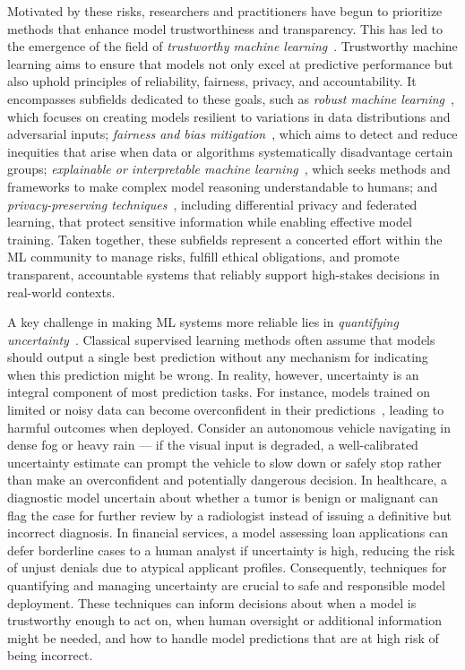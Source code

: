 Motivated by these risks, researchers and practitioners have begun to prioritize methods that enhance model trustworthiness and transparency. This has led to the emergence of the field of \textit{trustworthy machine learning}~\citep{li2023trustworthy}. Trustworthy machine learning aims to ensure that models not only excel at predictive performance but also uphold principles of reliability, fairness, privacy, and accountability. It encompasses subfields dedicated to these goals, such as \textit{robust machine learning}~\citep{szegedy2013intriguing, papernot2017practical, rahimian2022frameworks}, which focuses on creating models resilient to variations in data distributions and adversarial inputs; \textit{fairness and bias mitigation}~\citep{hardt2016equality, mehrabi2021survey}, which aims to detect and reduce inequities that arise when data or algorithms systematically disadvantage certain groups; \textit{explainable or interpretable machine learning}~\citep{chen2019looks, rudin2019stop}, which seeks methods and frameworks to make complex model reasoning understandable to humans; and \textit{privacy-preserving techniques}~\citep{dwork2014algorithmic, abadi2016deep}, including differential privacy and federated learning, that protect sensitive information while enabling effective model training. Taken together, these subfields represent a concerted effort within the ML community to manage risks, fulfill ethical obligations, and promote transparent, accountable systems that reliably support high-stakes decisions in real-world contexts.

A key challenge in making ML systems more reliable lies in \textit{quantifying uncertainty}~\citep{gal2016uncertainty, hullermeier2021aleatoric, gawlikowski2023survey}. Classical supervised learning methods often assume that models should output a single best prediction without any mechanism for indicating when this prediction might be wrong. In reality, however, uncertainty is an integral component of most prediction tasks. For instance, models trained on limited or noisy data can become overconfident in their predictions~\citep{guo2017calibration}, leading to harmful outcomes when deployed. Consider an autonomous vehicle navigating in dense fog or heavy rain — if the visual input is degraded, a well-calibrated uncertainty estimate can prompt the vehicle to slow down or safely stop rather than make an overconfident and potentially dangerous decision. In healthcare, a diagnostic model uncertain about whether a tumor is benign or malignant can flag the case for further review by a radiologist instead of issuing a definitive but incorrect diagnosis. In financial services, a model assessing loan applications can defer borderline cases to a human analyst if uncertainty is high, reducing the risk of unjust denials due to atypical applicant profiles. Consequently, techniques for quantifying and managing uncertainty are crucial to safe and responsible model deployment. These techniques can inform decisions about when a model is trustworthy enough to act on, when human oversight or additional information might be needed, and how to handle model predictions that are at high risk of being incorrect.


